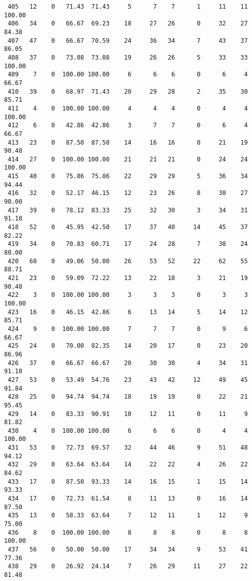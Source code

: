 \begin{verbatim}
 405   12    0   71.43  71.43     5      7    7      1     11    11   100.00
 406   34    0   66.67  69.23    18     27   26      0     32    27    84.38
 407   47    0   66.67  70.59    24     36   34      7     43    37    86.05
 408   37    0   73.08  73.08    19     26   26      5     33    33   100.00
 409    7    0  100.00 100.00     6      6    6      0      6     4    66.67
 410   39    0   68.97  71.43    20     29   28      2     35    30    85.71
 411    4    0  100.00 100.00     4      4    4      0      4     4   100.00
 412    6    0   42.86  42.86     3      7    7      0      6     4    66.67
 413   23    0   87.50  87.50    14     16   16      0     21    19    90.48
 414   27    0  100.00 100.00    21     21   21      0     24    24   100.00
 415   40    0   75.86  75.86    22     29   29      5     36    34    94.44
 416   32    0   52.17  46.15    12     23   26      8     30    27    90.00
 417   39    0   78.12  83.33    25     32   30      3     34    31    91.18
 418   52    0   45.95  42.50    17     37   40     14     45    37    82.22
 419   34    0   70.83  60.71    17     24   28      7     30    24    80.00
 420   68    0   49.06  50.00    26     53   52     22     62    55    88.71
 421   23    0   59.09  72.22    13     22   18      3     21    19    90.48
 422    3    0  100.00 100.00     3      3    3      0      3     3   100.00
 423   16    0   46.15  42.86     6     13   14      5     14    12    85.71
 424    9    0  100.00 100.00     7      7    7      0      9     6    66.67
 425   24    0   70.00  82.35    14     20   17      0     23    20    86.96
 426   37    0   66.67  66.67    20     30   30      4     34    31    91.18
 427   53    0   53.49  54.76    23     43   42     12     49    45    91.84
 428   25    0   94.74  94.74    18     19   19      0     22    21    95.45
 429   14    0   83.33  90.91    10     12   11      0     11     9    81.82
 430    4    0  100.00 100.00     6      6    6      0      4     4   100.00
 431   53    0   72.73  69.57    32     44   46      9     51    48    94.12
 432   29    0   63.64  63.64    14     22   22      4     26    22    84.62
 433   17    0   87.50  93.33    14     16   15      1     15    14    93.33
 434   17    0   72.73  61.54     8     11   13      0     16    14    87.50
 435   13    0   58.33  63.64     7     12   11      1     12     9    75.00
 436    8    0  100.00 100.00     8      8    8      0      8     8   100.00
 437   56    0   50.00  50.00    17     34   34      9     53    41    77.36
 438   29    0   26.92  24.14     7     26   29     11     27    22    81.48

\end{verbatim}
